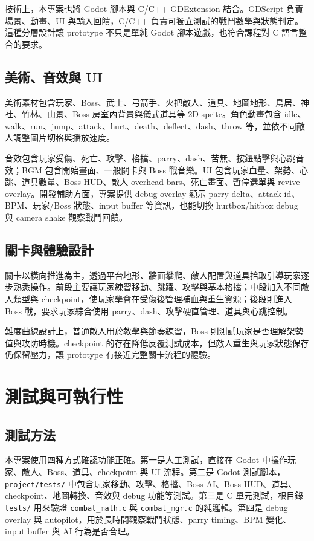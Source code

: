 \documentclass[12pt,a4paper]{article}
\begin{document}
技術上，本專案也將 Godot 腳本與 C/C++ GDExtension 結合。GDScript 負責場景、動畫、UI 與輸入回饋，C/C++ 負責可獨立測試的戰鬥數學與狀態判定。這種分層設計讓 prototype 不只是單純 Godot 腳本遊戲，也符合課程對 C 語言整合的要求。

\subsection{美術、音效與 UI}
美術素材包含玩家、Boss、武士、弓箭手、火把敵人、道具、地圖地形、鳥居、神社、竹林、山景、Boss 房室內背景與儀式道具等 2D sprite。角色動畫包含 idle、walk、run、jump、attack、hurt、death、deflect、dash、throw 等，並依不同敵人調整圖片切格與播放速度。

音效包含玩家受傷、死亡、攻擊、格擋、parry、dash、苦無、按鈕點擊與心跳音效；BGM 包含開始畫面、一般關卡與 Boss 戰音樂。UI 包含玩家血量、架勢、心跳、道具數量、Boss HUD、敵人 overhead bars、死亡畫面、暫停選單與 revive overlay。開發輔助方面，專案提供 debug overlay 顯示 parry delta、attack id、BPM、玩家/Boss 狀態、input buffer 等資訊，也能切換 hurtbox/hitbox debug 與 camera shake 觀察戰鬥回饋。

\subsection{關卡與體驗設計}
關卡以橫向推進為主，透過平台地形、牆面攀爬、敵人配置與道具拾取引導玩家逐步熟悉操作。前段主要讓玩家練習移動、跳躍、攻擊與基本格擋；中段加入不同敵人類型與 checkpoint，使玩家學會在受傷後管理補血與重生資源；後段則進入 Boss 戰，要求玩家綜合使用 parry、dash、攻擊硬直管理、道具與心跳控制。

難度曲線設計上，普通敵人用於教學與節奏練習，Boss 則測試玩家是否理解架勢值與攻防時機。checkpoint 的存在降低反覆測試成本，但敵人重生與玩家狀態保存仍保留壓力，讓 prototype 有接近完整關卡流程的體驗。

\section{測試與可執行性}

\subsection{測試方法}
本專案使用四種方式確認功能正確。第一是人工測試，直接在 Godot 中操作玩家、敵人、Boss、道具、checkpoint 與 UI 流程。第二是 Godot 測試腳本，\texttt{project/tests/} 中包含玩家移動、攻擊、格擋、Boss AI、Boss HUD、道具、checkpoint、地圖轉換、音效與 debug 功能等測試。第三是 C 單元測試，根目錄 \texttt{tests/} 用來驗證 \texttt{combat\_math.c} 與 \texttt{combat\_mgr.c} 的純邏輯。第四是 debug overlay 與 autopilot，用於長時間觀察戰鬥狀態、parry timing、BPM 變化、input buffer 與 AI 行為是否合理。
\end{document}
